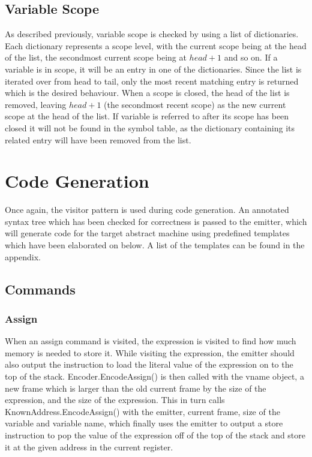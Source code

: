\documentclass{article}
\begin{document}
\subsection{Variable Scope}
As described previously, variable scope is checked by using a list of dictionaries. Each dictionary represents a scope level, with the current scope being at the head of the list, the secondmost current scope being at $head + 1$ and so on. If a variable is in scope, it will be an entry in one of the dictionaries. Since the list is iterated over from head to tail, only the most recent matching entry is returned which is the desired behaviour. When a scope is closed, the head of the list is removed, leaving $head + 1$ (the secondmost recent scope) as the new current scope at the head of the list. If variable is referred to after its scope has been closed it will not be found in the symbol table, as the dictionary containing its related entry will have been removed from the list.

\section{Code Generation}
Once again, the visitor pattern is used during code generation. An annotated syntax tree which has been checked for correctness is passed to the emitter, which will generate code for the target abstract machine using predefined templates which have been elaborated on below. A list of the templates can be found in the appendix.

\subsection{Commands}
\subsubsection{Assign}
When an assign command is visited, the expression is visited to find how much memory is needed to store it. While visiting the expression, the emitter should also output the instruction to load the literal value of the expression on to the top of the stack. Encoder.EncodeAssign() is then called with the vname object, a new frame which is larger than the old current frame by the size of the expression, and the size of the expression. This in turn calls KnownAddress.EncodeAssign() with the emitter, current frame, size of the variable and variable name, which finally uses the emitter to output a store instruction to pop the value of the expression off of the top of the stack and store it at the given address in the current register.
\end{document}
